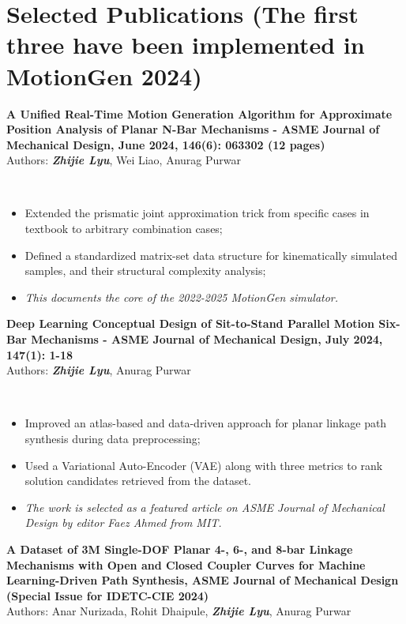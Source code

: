 \documentclass[letterpaper,10pt]{article}
\begin{document}
\section{Selected Publications (The first three have been implemented in MotionGen 2024)}
 \begin{itemize}[leftmargin=0.15in, label={}]
    \item{
    \textbf{A Unified Real-Time Motion Generation Algorithm for Approximate Position Analysis of Planar N-Bar Mechanisms - ASME Journal of Mechanical Design, June 2024, 146(6): 063302 (12 pages)}{\\ Authors: \textbf{ \emph{Zhijie Lyu}}, Wei Liao, Anurag Purwar}
    {\\ \small{\begin{itemize}
        \item Extended the prismatic joint approximation trick from specific cases in textbook to arbitrary combination cases; 
        \item Defined a standardized matrix-set data structure for kinematically simulated samples, and their structural complexity analysis; 
        \item \emph{This documents the core of the 2022-2025 MotionGen simulator.}
    \end{itemize} 
    }}
    }
    \item{\textbf{Deep Learning Conceptual Design of Sit-to-Stand Parallel Motion Six-Bar Mechanisms - ASME Journal of Mechanical Design, July 2024, 147(1): 1-18}{\\ Authors: \textbf{\emph{Zhijie Lyu}}, Anurag Purwar}
    {\\ \small{\begin{itemize}
        \item Improved an atlas-based and data-driven approach for planar linkage path synthesis during data preprocessing; 
        \item Used a Variational Auto-Encoder (VAE) along with three metrics to rank solution candidates retrieved from the dataset. 
        \item \emph{The work is selected as a featured article on ASME Journal of Mechanical Design by editor Faez Ahmed from MIT. }
    \end{itemize}}}
    \item{\textbf{A Dataset of 3M Single-DOF Planar 4-, 6-, and 8-bar Linkage Mechanisms with Open and Closed Coupler Curves for Machine Learning-Driven Path Synthesis, ASME Journal of Mechanical Design (Special Issue for IDETC-CIE 2024)}{\\ Authors: Anar Nurizada, Rohit Dhaipule, \emph{\textbf{Zhijie Lyu}}, Anurag Purwar}
}}
\end{itemize}
\end{document}
